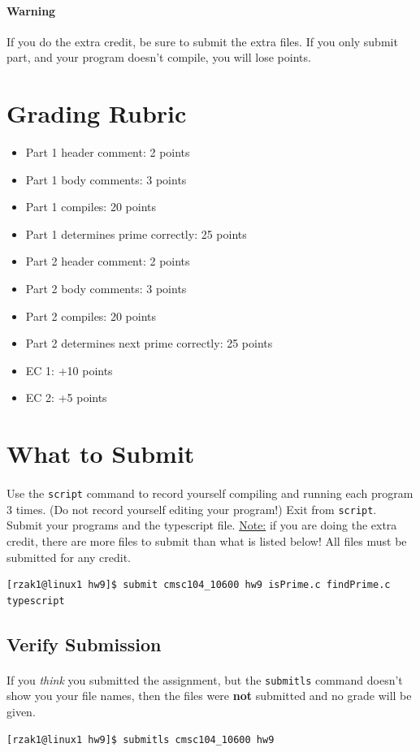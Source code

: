 \documentclass[letter,11pt]{article}
\begin{document}
\paragraph{Warning}If you do the extra credit, be sure to submit the extra files. If you only submit part, and your program doesn't compile, you will lose points.

\section*{Grading Rubric}
\begin{itemize}
    \item Part 1 header comment: 2 points
    \item Part 1 body comments: 3 points
    \item Part 1 compiles: 20 points
    \item Part 1 determines prime correctly: 25 points
    \item Part 2 header comment: 2 points
    \item Part 2 body comments: 3 points
    \item Part 2 compiles: 20 points
    \item Part 2 determines next prime correctly: 25 points
    \item EC 1: +10 points
    \item EC 2:  +5 points
\end{itemize}

\section*{What to Submit}
\paragraph{}Use the \texttt{script} command to record yourself compiling and running each program 3 times. (Do not record yourself editing your program!) Exit from \texttt{script}. Submit your programs and the typescript file. \underline{Note:} if you are doing the extra credit, there are more files to submit than what is listed below! All files must be submitted for any credit.
\begin{verbatim}
[rzak1@linux1 hw9]$ submit cmsc104_10600 hw9 isPrime.c findPrime.c typescript
\end{verbatim}

\subsection*{Verify Submission}
\paragraph{}If you \textit{think} you submitted the assignment, but the \texttt{submitls} command doesn't show you your file names, then the files were \textbf{not} submitted and no grade will be given.
\begin{verbatim}
[rzak1@linux1 hw9]$ submitls cmsc104_10600 hw9
\end{verbatim}
\end{document}
